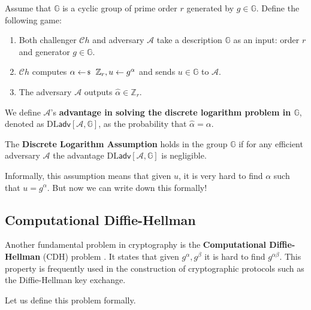 \documentclass[../lecture-notes-148x210.tex]{subfiles}
\begin{document}
\begin{definition}
    Assume that $\mathbb{G}$ is a cyclic group of prime order $r$ generated by $g \in \mathbb{G}$. Define the 
    following game:
    \begin{enumerate}
        \item Both challenger $\mathcal{C}h$ and adversary $\mathcal{A}$ take a description $\mathbb{G}$ as an 
        input: order $r$ and generator $g \in \mathbb{G}$.
        \item $\mathcal{C}h$ computes $\alpha \leftarrowS \mathbb{Z}_r, u \gets g^{\alpha}$ and sends 
        $u \in \mathbb{G}$ to $\mathcal{A}$.
        \item The adversary $\mathcal{A}$ outputs $\hat{\alpha} \in \mathbb{Z}_r$.
    \end{enumerate}

    We define $\mathcal{A}$'s \textbf{advantage in solving the discrete logarithm problem in $\mathbb{G}$}, 
    denoted as $\text{DL}\mathsf{adv}[\mathcal{A},\mathbb{G}]$, as the probability that $\hat{\alpha} = \alpha$.
\end{definition}

\begin{definition}
    The \textbf{Discrete Logarithm Assumption} holds in the group $\mathbb{G}$ 
    if for any efficient adversary $\mathcal{A}$ the advantage $\text{DL}\mathsf{adv}[\mathcal{A},\mathbb{G}]$ 
    is negligible.
\end{definition}

Informally, this assumption means that given $u$, it is very hard to find $\alpha$ such that $u = g^{\alpha}$. 
But now we can write down this formally!

\subsection{Computational Diffie-Hellman}

Another fundamental problem in cryptography is the \textbf{Computational Diffie-Hellman} (CDH) problem \cite[chapter 16]{Dan_Boneh_2023}. 
It states that given $g^{\alpha},g^{\beta}$ it is hard to find $g^{\alpha\beta}$. This property is frequently used 
in the construction of cryptographic protocols such as the Diffie-Hellman key exchange.

Let us define this problem formally.
\end{document}
